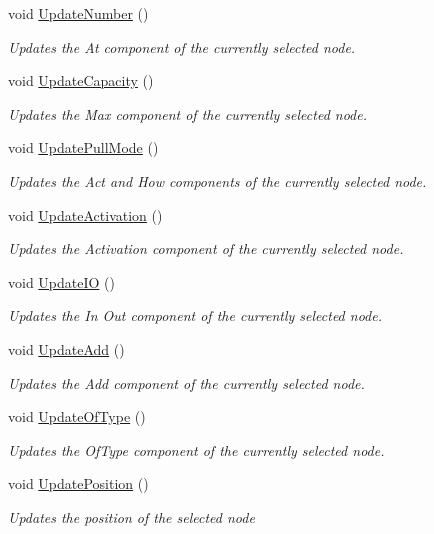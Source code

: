 \begin{DoxyCompactItemize}
void \hyperlink{class_node_inspector_af94d04b7f31d5788591fa21f1c1ed1af}{Update\+Number} ()
\begin{DoxyCompactList}\small\item\em Updates the At component of the currently selected node. \end{DoxyCompactList}\item 
void \hyperlink{class_node_inspector_a5e707e8401204ddfab6e3468b007440f}{Update\+Capacity} ()
\begin{DoxyCompactList}\small\item\em Updates the Max component of the currently selected node. \end{DoxyCompactList}\item 
void \hyperlink{class_node_inspector_a700b7af667de0b1d5bbdca2051ae74c6}{Update\+Pull\+Mode} ()
\begin{DoxyCompactList}\small\item\em Updates the Act and How components of the currently selected node. \end{DoxyCompactList}\item 
void \hyperlink{class_node_inspector_a3886723916c36d8435c4c9c477a97040}{Update\+Activation} ()
\begin{DoxyCompactList}\small\item\em Updates the Activation component of the currently selected node. \end{DoxyCompactList}\item 
void \hyperlink{class_node_inspector_a3bf3fdb379bb3ed7acfb3099163538c4}{Update\+IO} ()
\begin{DoxyCompactList}\small\item\em Updates the In Out component of the currently selected node. \end{DoxyCompactList}\item 
void \hyperlink{class_node_inspector_ab378830e6c5353dc122bf5a99a30cb3a}{Update\+Add} ()
\begin{DoxyCompactList}\small\item\em Updates the Add component of the currently selected node. \end{DoxyCompactList}\item 
void \hyperlink{class_node_inspector_acbb1e1d49e8e382ea41c9685bb31f978}{Update\+Of\+Type} ()
\begin{DoxyCompactList}\small\item\em Updates the Of\+Type component of the currently selected node. \end{DoxyCompactList}\item 
void \hyperlink{class_node_inspector_a7d2d42f0b36ed545ee032cce4373ac82}{Update\+Position} ()
\begin{DoxyCompactList}\small\item\em Updates the position of the selected node \end{DoxyCompactList}\end{DoxyCompactItemize}
